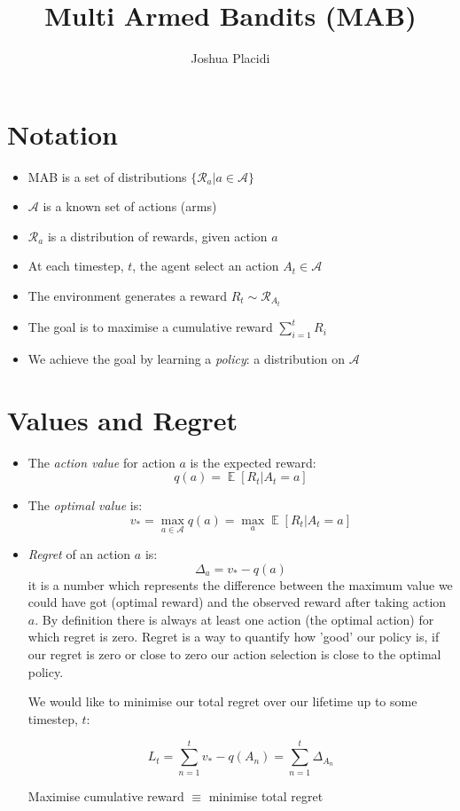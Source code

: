 \documentclass{article}
\title{Multi Armed Bandits (MAB)}
\author{Joshua Placidi}
\DeclareMathOperator{\EX}{\mathbb{E}}%
\begin{document}
\maketitle

\section{Notation}
\begin{itemize}
    \item MAB is a set of distributions $\{\mathcal{R}_a | a \in \mathcal{A}\}$
    \item $\mathcal{A}$ is a known set of actions (arms)
    \item $\mathcal{R}_a$ is a distribution of rewards, given action $a$
    \item At each timestep, $t$, the agent select an action $A_t \in \mathcal{A}$
    \item The environment generates a reward $R_t \sim \mathcal{R}_{A_t}$
    \item The goal is to maximise a cumulative reward $\sum_{i=1}^{t}R_i$
    \item We achieve the goal by learning a \emph{policy}: a distribution on $\mathcal{A}$
\end{itemize}

\section{Values and Regret}
\begin{itemize}
\item 
The \emph{action value} for action $a$ is the expected reward:
\[q(a) = \EX[R_t|A_t=a]\]

\item
The \emph{optimal value} is:
\[v_* = \max_{a \in \mathcal{A}} q(a) = \max_{a} \EX[R_t|A_t=a] \]

\item
\emph{Regret} of an action $a$ is:
\[\Delta_a = v_* - q(a)\]
it is a number which represents the difference between the maximum value we could have got (optimal reward) and the observed reward after taking action $a$. By definition there is always at least one action (the optimal action) for which regret is zero. Regret is a way to quantify how 'good' our policy is, if our regret is zero or close to zero our action selection is close to the optimal policy.


We would like to minimise our total regret over our lifetime up to some timestep, $t$:

\[L_t = \sum_{n=1}^{t}v_*-q(A_n)=\sum_{n=1}^{t}\Delta_{A_n}\]

Maximise cumulative reward $\equiv$ minimise total regret

\end{itemize}
\end{document}
